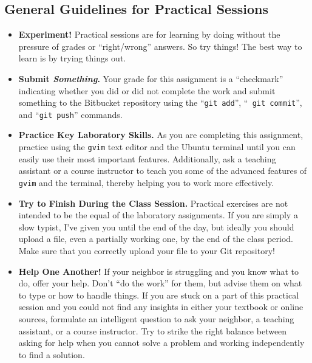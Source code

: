\vspace*{-.2in}
\subsection*{General Guidelines for Practical Sessions}


\vspace*{-.05in}
\begin{itemize}

\itemsep 0in

\item {\bf Experiment!} Practical sessions are for learning by doing without the pressure of grades or ``right/wrong''
  answers. So try things!  The best way to learn is by trying things out.

\item {\bf Submit \textbf{\textit{Something}}.} Your grade for this assignment is a ``checkmark'' indicating whether you
  did or did not complete the work and submit something to the Bitbucket repository using the ``{\tt git add}'', ``{\tt
    git commit}'', and ``{\tt git push}'' commands.

\item {\bf Practice Key Laboratory Skills.} As you are completing this assignment, practice using the {\tt gvim} text
  editor and the Ubuntu terminal until you can easily use their most important features.  Additionally, ask
  a teaching assistant or a course instructor to teach you some of the advanced features of {\tt gvim} and the
  terminal, thereby helping you to work more effectively.

\item {\bf Try to Finish During the Class Session.} Practical exercises are not intended to be the equal of the
  laboratory assignments. If you are simply a slow typist, I've given you until the end of the day, but ideally you
  should upload a file, even a partially working one, by the end of the class period. Make sure that you correctly
  upload your file to your Git repository!


\item {\bf Help One Another!} If your neighbor is struggling and you know what to do, offer your help. Don't ``do the
  work'' for them, but advise them on what to type or how to handle things. If you are stuck on a part of this practical
  session and you could not find any insights in either your textbook or online sources, formulate an intelligent
  question to ask your neighbor, a teaching assistant, or a course instructor. Try to strike the right balance between
  asking for help when you cannot solve a problem and working independently to find a solution.


\end{itemize}
